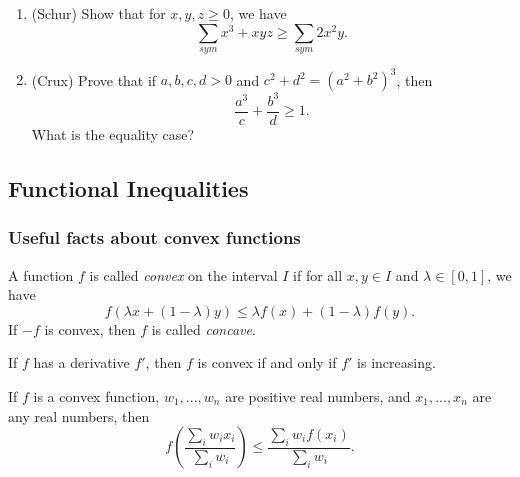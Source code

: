 \begin{enumerate}
\item (Schur) Show that for $x,y,z\ge 0$, we have
\[
\sum_{sym} x^3+xyz \ge \sum_{sym} 2x^2y.
\]

\item (Crux) Prove that if $a,b,c,d > 0$ and $c^2+d^2 = (a^2+b^2)^3$, then
\[
\frac{a^3}{c} + \frac{b^3}{d} \ge 1.
\]
What is the equality case?

\begin{comment}
\item (Crux) Prove that for all $n$ and all $0 < a_1 \le \cdots \le a_n$, we have
\[
\frac{1}{2n^2}\frac{\sum_{i<j}(a_j-a_i)^2}{a_n} \le \frac{\sum_i a_i}{n}-\sqrt[n]{a_1\cdots a_n} \le \frac{1}{2n^2}\frac{\sum_{i<j}(a_j-a_i)^2}{a_1}.
\]
\end{comment}
\end{enumerate}

\subsection{Functional Inequalities}

\subsubsection{Useful facts about convex functions}

\begin{defn} A function $f$ is called \emph{convex} on the interval $I$ if for all $x,y\in I$ and $\lambda\in [0,1]$, we have
\[
f(\lambda x + (1-\lambda)y) \le \lambda f(x) + (1-\lambda)f(y).
\]
If $-f$ is convex, then $f$ is called \emph{concave}.
\end{defn}

\begin{thm} If $f$ has a derivative $f'$, then $f$ is convex if and only if $f'$ is increasing.
\end{thm}

\begin{thm} If $f$ is a convex function, $w_1, ..., w_n$ are positive real numbers, and $x_1, ..., x_n$ are any real numbers, then
\[
f\left(\frac{\sum_i w_ix_i}{\sum_i w_i}\right) \le \frac{\sum_i w_if(x_i)}{\sum_i w_i}.
\]
\end{thm}

